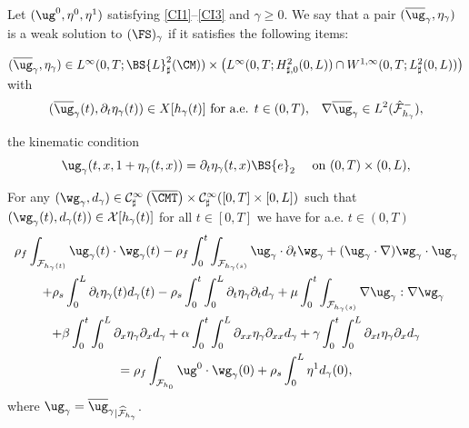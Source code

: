 \begin{definition} \label{def.ws}
Let $(\ug^{0},\eta^{0},\eta^{1})$ satisfying \eqref{CI1}--\eqref{CI3} and $\gamma \geq 0$.
We say that a pair $({\overline{\ug}_\gamma},\eta_\gamma)$ is a weak solution to $(\FS)_\gamma$ if it satisfies the following items:
\begin{enumeratei}
\item\label{def.wsi} $({\overline{\ug}_\gamma},\eta_\gamma)\in L^{\infty}(0,T;\BS{L}_{\sharp}^{2}(\CM))\times \bigl(L^{\infty}(0,T;H^{2}_{\sharp, 0}(0,L))\cap W^{1,\infty}(0,T;L_\sharp^{2}(0,L))\bigr)$ with\vspace*{-3pt}
\[
({\overline{\ug}_\gamma}(t), \partial_t\eta_\gamma(t))\in X[h_\gamma(t)] \text{ for a.e. $t\in(0,T)$,} \quad
\nabla \overline{\ug}_\gamma \in L^{2}(\hat{\mathcal{F}}^{-}_{h_\gamma}),
\]
\item\label{def.wsii} the kinematic condition
\[
\ug_\gamma(t, x, 1+\eta_\gamma(t, x))=\partial_t\eta_\gamma(t,x) \BS{e}_2 \quad \textrm{ on } (0, T) \times (0, L),
\]
\item\label{def.wsiii}
For any $(\wg_\gamma, d_\gamma)\in \mathcal{C}_\sharp^{\infty}\left(\overline{\CMT}\right)\times\mathcal{C}_\sharp^{\infty}( [0, T]\times[0, L] )$ such that $(\wg_\gamma(t), d_\gamma(t))\in\mathcal{X}[h_\gamma(t)]$ for all $t\in [0,T]$ we have for a.e. $t\in(0,T)$
\begin{multline}\label{weak.formulation.FS}
\rho_{f}\int_{\mathcal{F}_{h_\gamma(t)}}\ug_\gamma(t)\cdot\wg_\gamma(t) -\rho_{f}\int_{0}^{t}\int_{\mathcal{F}_{h_\gamma(s)}}\ug_\gamma\cdot\partial_{t}\wg_\gamma + (\ug_\gamma\cdot\nabla)\wg_\gamma\cdot\ug_\gamma\\
\hspace*{4mm}+\rho_{s}\int_{0}^{L}\partial_{t}\eta_\gamma(t)d_\gamma(t)-\rho_{s}\int_{0}^{t}\int_{0}^{L}\partial_{t}\eta_\gamma\partial_{t}d_\gamma+\mu\int_{0}^{t}\int_{\mathcal{F}_{h_\gamma(s)}} \nabla\ug_\gamma:\nabla\wg_\gamma\\
+\beta\int_{0}^{t}\int_{0}^{L}\partial_{x}\eta_\gamma\partial_{x}d_\gamma + \alpha\int_{0}^{t}\int_{0}^{L}\partial_{xx}\eta_\gamma\partial_{xx}d_\gamma+\gamma\int_{0}^{t}\int_{0}^{L}\partial_{xt}\eta_\gamma\partial_{x}d_\gamma \\
=\rho_{f}\int_{\mathcal{F}_{h_0}}\ug^{0}\cdot\wg_\gamma(0)+\rho_{s}\int_{0}^{L}\eta^{1}d_\gamma(0),
\end{multline}
where $\ug_\gamma={\overline{\ug}_\gamma}_{\vert \widehat{\mathcal{F}}_{h_\gamma}}$.
\end{enumeratei}
\end{definition}

